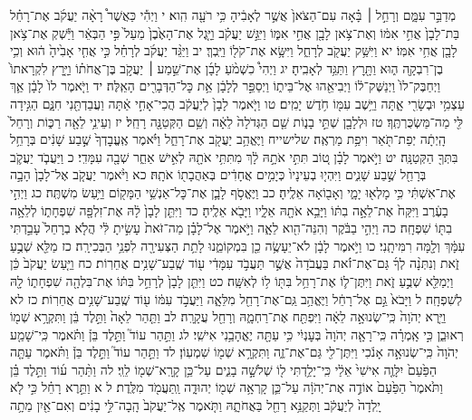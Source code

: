 \documentclass[twoside, openany, parskip=half, 11pt]{book}
\begin{document}
מְדַבֵּ֣ר עִמָּ֑ם וְרָחֵ֣ל ׀ בָּ֗אָה עִם־הַצֹּאן֙ אֲשֶׁ֣ר לְאָבִ֔יהָ כִּ֥י רֹעָ֖ה הִֽוא׃ י וַיְהִ֡י כַּאֲשֶׁר֩ רָאָ֨ה יַעֲקֹ֜ב אֶת־רָחֵ֗ל בַּת־לָבָן֙ אֲחִ֣י אִמּ֔וֹ וְאֶת־צֹ֥אן לָבָ֖ן אֲחִ֣י אִמּ֑וֹ וַיִּגַּ֣שׁ יַעֲקֹ֗ב וַיָּ֤גֶל אֶת־הָאֶ֙בֶן֙ מֵעַל֙ פִּ֣י הַבְּאֵ֔ר וַיַּ֕שְׁקְ אֶת־צֹ֥אן לָבָ֖ן אֲחִ֥י אִמּֽוֹ׃ יא וַיִּשַּׁ֥ק יַעֲקֹ֖ב לְרָחֵ֑ל וַיִּשָּׂ֥א אֶת־קֹל֖וֹ וַיֵּֽבְךְּ׃ יב וַיַּגֵּ֨ד יַעֲקֹ֜ב לְרָחֵ֗ל כִּ֣י אֲחִ֤י אָבִ֙יהָ֙ ה֔וּא וְכִ֥י בֶן־רִבְקָ֖ה ה֑וּא וַתָּ֖רׇץ וַתַּגֵּ֥ד לְאָבִֽיהָ׃ יג וַיְהִי֩ כִשְׁמֹ֨עַ לָבָ֜ן אֶת־שֵׁ֣מַע ׀ יַעֲקֹ֣ב בֶּן־אֲחֹת֗וֹ וַיָּ֤רׇץ לִקְרָאתוֹ֙ וַיְחַבֶּק־לוֹ֙ וַיְנַשֶּׁק־ל֔וֹ וַיְבִיאֵ֖הוּ אֶל־בֵּית֑וֹ וַיְסַפֵּ֣ר לְלָבָ֔ן אֵ֥ת כׇּל־הַדְּבָרִ֖ים הָאֵֽלֶּה׃ יד וַיֹּ֤אמֶר לוֹ֙ לָבָ֔ן אַ֛ךְ עַצְמִ֥י וּבְשָׂרִ֖י אָ֑תָּה וַיֵּ֥שֶׁב עִמּ֖וֹ חֹ֥דֶשׁ יָמִֽים׃ טו וַיֹּ֤אמֶר לָבָן֙ לְיַעֲקֹ֔ב הֲכִי־אָחִ֣י אַ֔תָּה וַעֲבַדְתַּ֖נִי חִנָּ֑ם הַגִּ֥ידָה לִּ֖י מַה־מַּשְׂכֻּרְתֶּֽךָ׃ טז וּלְלָבָ֖ן שְׁתֵּ֣י בָנ֑וֹת שֵׁ֤ם הַגְּדֹלָה֙ לֵאָ֔ה וְשֵׁ֥ם הַקְּטַנָּ֖ה רָחֵֽל׃ יז וְעֵינֵ֥י לֵאָ֖ה רַכּ֑וֹת וְרָחֵל֙ הָֽיְתָ֔ה יְפַת־תֹּ֖אַר וִיפַ֥ת מַרְאֶֽה׃ שלישייח וַיֶּאֱהַ֥ב יַעֲקֹ֖ב אֶת־רָחֵ֑ל וַיֹּ֗אמֶר אֶֽעֱבׇדְךָ֙ שֶׁ֣בַע שָׁנִ֔ים בְּרָחֵ֥ל בִּתְּךָ֖ הַקְּטַנָּֽה׃ יט וַיֹּ֣אמֶר לָבָ֗ן ט֚וֹב תִּתִּ֣י אֹתָ֣הּ לָ֔ךְ מִתִּתִּ֥י אֹתָ֖הּ לְאִ֣ישׁ אַחֵ֑ר שְׁבָ֖ה עִמָּדִֽי׃ כ וַיַּעֲבֹ֧ד יַעֲקֹ֛ב בְּרָחֵ֖ל שֶׁ֣בַע שָׁנִ֑ים וַיִּהְי֤וּ בְעֵינָיו֙ כְּיָמִ֣ים אֲחָדִ֔ים בְּאַהֲבָת֖וֹ אֹתָֽהּ׃ כא וַיֹּ֨אמֶר יַעֲקֹ֤ב אֶל־לָבָן֙ הָבָ֣ה אֶת־אִשְׁתִּ֔י כִּ֥י מָלְא֖וּ יָמָ֑י וְאָב֖וֹאָה אֵלֶֽיהָ׃ כב וַיֶּאֱסֹ֥ף לָבָ֛ן אֶת־כׇּל־אַנְשֵׁ֥י הַמָּק֖וֹם וַיַּ֥עַשׂ מִשְׁתֶּֽה׃ כג וַיְהִ֣י בָעֶ֔רֶב וַיִּקַּח֙ אֶת־לֵאָ֣ה בִתּ֔וֹ וַיָּבֵ֥א אֹתָ֖הּ אֵלָ֑יו וַיָּבֹ֖א אֵלֶֽיהָ׃ כד וַיִּתֵּ֤ן לָבָן֙ לָ֔הּ אֶת־זִלְפָּ֖ה שִׁפְחָת֑וֹ לְלֵאָ֥ה בִתּ֖וֹ שִׁפְחָֽה׃ כה וַיְהִ֣י בַבֹּ֔קֶר וְהִנֵּה־הִ֖וא לֵאָ֑ה וַיֹּ֣אמֶר אֶל־לָבָ֗ן מַה־זֹּאת֙ עָשִׂ֣יתָ לִּ֔י הֲלֹ֤א בְרָחֵל֙ עָבַ֣דְתִּי עִמָּ֔ךְ וְלָ֖מָּה רִמִּיתָֽנִי׃ כו וַיֹּ֣אמֶר לָבָ֔ן לֹא־יֵעָשֶׂ֥ה כֵ֖ן בִּמְקוֹמֵ֑נוּ לָתֵ֥ת הַצְּעִירָ֖ה לִפְנֵ֥י הַבְּכִירָֽה׃ כז מַלֵּ֖א שְׁבֻ֣עַ זֹ֑את וְנִתְּנָ֨ה לְךָ֜ גַּם־אֶת־זֹ֗את בַּעֲבֹדָה֙ אֲשֶׁ֣ר תַּעֲבֹ֣ד עִמָּדִ֔י ע֖וֹד שֶֽׁבַע־שָׁנִ֥ים אֲחֵרֽוֹת׃ כח וַיַּ֤עַשׂ יַעֲקֹב֙ כֵּ֔ן וַיְמַלֵּ֖א שְׁבֻ֣עַ זֹ֑את וַיִּתֶּן־ל֛וֹ אֶת־רָחֵ֥ל בִּתּ֖וֹ ל֥וֹ לְאִשָּֽׁה׃ כט וַיִּתֵּ֤ן לָבָן֙ לְרָחֵ֣ל בִּתּ֔וֹ אֶת־בִּלְהָ֖ה שִׁפְחָת֑וֹ לָ֖הּ לְשִׁפְחָֽה׃ ל וַיָּבֹא֙ גַּ֣ם אֶל־רָחֵ֔ל וַיֶּאֱהַ֥ב גַּֽם־אֶת־רָחֵ֖ל מִלֵּאָ֑ה וַיַּעֲבֹ֣ד עִמּ֔וֹ ע֖וֹד שֶֽׁבַע־שָׁנִ֥ים אֲחֵרֽוֹת׃ כז לא וַיַּ֤רְא יְהֹוָה֙ כִּֽי־שְׂנוּאָ֣ה לֵאָ֔ה וַיִּפְתַּ֖ח אֶת־רַחְמָ֑הּ וְרָחֵ֖ל עֲקָרָֽה׃ לב וַתַּ֤הַר לֵאָה֙ וַתֵּ֣לֶד בֵּ֔ן וַתִּקְרָ֥א שְׁמ֖וֹ רְאוּבֵ֑ן כִּ֣י אָֽמְרָ֗ה כִּֽי־רָאָ֤ה יְהֹוָה֙ בְּעׇנְיִ֔י כִּ֥י עַתָּ֖ה יֶאֱהָבַ֥נִי אִישִֽׁי׃ לג וַתַּ֣הַר עוֹד֮ וַתֵּ֣לֶד בֵּן֒ וַתֹּ֗אמֶר כִּֽי־שָׁמַ֤ע יְהֹוָה֙ כִּֽי־שְׂנוּאָ֣ה אָנֹ֔כִי וַיִּתֶּן־לִ֖י גַּם־אֶת־זֶ֑ה וַתִּקְרָ֥א שְׁמ֖וֹ שִׁמְעֽוֹן׃ לד וַתַּ֣הַר עוֹד֮ וַתֵּ֣לֶד בֵּן֒ וַתֹּ֗אמֶר עַתָּ֤ה הַפַּ֙עַם֙ יִלָּוֶ֤ה אִישִׁי֙ אֵלַ֔י כִּֽי־יָלַ֥דְתִּי ל֖וֹ שְׁלֹשָׁ֣ה בָנִ֑ים עַל־כֵּ֥ן קָרָֽא־שְׁמ֖וֹ לֵוִֽי׃ לה וַתַּ֨הַר ע֜וֹד וַתֵּ֣לֶד בֵּ֗ן וַתֹּ֙אמֶר֙ הַפַּ֙עַם֙ אוֹדֶ֣ה אֶת־יְהֹוָ֔ה עַל־כֵּ֛ן קָרְאָ֥ה שְׁמ֖וֹ יְהוּדָ֑ה וַֽתַּעֲמֹ֖ד מִלֶּֽדֶת׃ ל א וַתֵּ֣רֶא רָחֵ֗ל כִּ֣י לֹ֤א יָֽלְדָה֙ לְיַעֲקֹ֔ב וַתְּקַנֵּ֥א רָחֵ֖ל בַּאֲחֹתָ֑הּ וַתֹּ֤אמֶר אֶֽל־יַעֲקֹב֙ הָֽבָה־לִּ֣י בָנִ֔ים וְאִם־אַ֖יִן מֵתָ֥ה 
\end{document}
